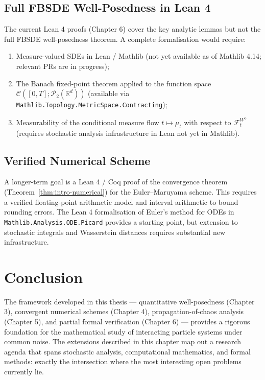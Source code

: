 \subsection{Full FBSDE Well-Posedness in Lean 4}

The current Lean 4 proofs (Chapter 6) cover the key analytic lemmas but not the
full FBSDE well-posedness theorem. A complete formalisation would require:
\begin{enumerate}
    \item Measure-valued SDEs in Lean / Mathlib (not yet available as of Mathlib
    4.14; relevant PRs are in progress);
    \item The Banach fixed-point theorem applied to the function space
    $\mathcal{C}([0,T]; \mathcal{P}_2(\mathbb{R}^d))$ (available via
    \texttt{Mathlib.Topology.MetricSpace.Contracting});
    \item Measurability of the conditional measure flow $t \mapsto \mu_t$ with
    respect to $\mathcal{F}_t^{W^0}$ (requires stochastic analysis infrastructure
    in Lean not yet in Mathlib).
\end{enumerate}

\subsection{Verified Numerical Scheme}

A longer-term goal is a Lean 4 / Coq proof of the convergence theorem
(Theorem~\ref{thm:intro-numerical}) for the Euler--Maruyama scheme. This requires
a verified floating-point arithmetic model and interval arithmetic to bound
rounding errors. The Lean 4 formalisation of Euler's method for ODEs in
\texttt{Mathlib.Analysis.ODE.Picard} provides a starting point, but
extension to stochastic integrals and Wasserstein distances requires substantial
new infrastructure.

\section{Conclusion}

The framework developed in this thesis --- quantitative well-posedness
(Chapter 3), convergent numerical schemes (Chapter 4), propagation-of-chaos
analysis (Chapter 5), and partial formal verification (Chapter 6) --- provides
a rigorous foundation for the mathematical study of interacting particle systems
under common noise. The extensions described in this chapter map out a research
agenda that spans stochastic analysis, computational mathematics, and formal
methods: exactly the intersection where the most interesting open problems
currently lie.
